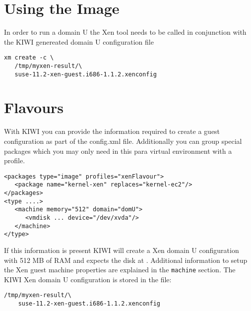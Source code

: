 \section{Using the Image}

In order to run a domain U the Xen tool  needs to be called
in conjunction with the KIWI genereated domain U configuration file

\begin{Command}{13cm}
\begin{verbatim}
xm create -c \
   /tmp/myxen-result/\
   suse-11.2-xen-guest.i686-1.1.2.xenconfig
\end{verbatim}
\end{Command}

\section{Flavours}

With KIWI you can provide the information
required to create a guest configuration as part of the config.xml
file. Additionally you can group special packages which you may only
need in this para virtual environment with a profile.

\begin{Command}{13cm}
\begin{verbatim}
<packages type="image" profiles="xenFlavour">
   <package name="kernel-xen" replaces="kernel-ec2"/>
</packages>
<type ....>
   <machine memory="512" domain="domU">
      <vmdisk ... device="/dev/xvda"/>
   </machine>
</type>
\end{verbatim}
\end{Command}

If this information is present KIWI will create a Xen domain U
configuration with 512 MB of RAM and expects the disk at .
Additional information to setup the Xen guest machine properties are
explained in the \texttt{machine} section. The KIWI Xen domain U
configuration is stored in the file:

\begin{Command}{13cm}
\begin{verbatim}
/tmp/myxen-result/\
    suse-11.2-xen-guest.i686-1.1.2.xenconfig
\end{verbatim}
\end{Command}
